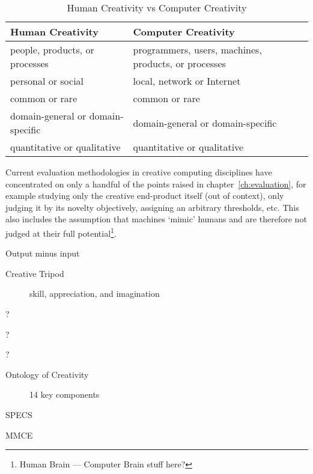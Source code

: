 \begin{table}[htbp]
  \centering
  \begin{tabu}{XX}
  \toprule
  \textbf{Human Creativity} & \textbf{Computer Creativity} \\
  \midrule
  people, products, or processes & programmers, users, machines, products, or processes \\
  personal or social & local, network or Internet \\
  common or rare & common or rare \\
  domain-general or domain-specific & domain-general or domain-specific \\
  quantitative or qualitative & quantitative or qualitative \\
  \bottomrule
  \end{tabu}
\caption[Human Creativity vs Computer Creativity]{Human Creativity vs Computer Creativity}
\label{tab:HCCC}
\end{table}


Current evaluation methodologies in creative computing disciplines have concentrated on only a handful of the points raised in chapter~\ref{ch:evaluation}, for example studying only the creative end-product itself (out of context), only judging it by its novelty objectively, assigning an arbitrary thresholds, etc. This also includes the assumption that machines `mimic' humans and are therefore not judged at their full potential\footnote{Human Brain --- Computer Brain stuff here?}.

\begin{description}
  \item [Output minus input] \autocite[p.2]{Pease2001}
  \item [Creative Tripod] skill, appreciation, and imagination \autocite{Colton2008a, Colton2008}
  \item [?] \autocite{Ritchie2007, Ritchie2001}
  \item [?] \autocite{Ventura2008}
  \item [?] \autocite{Pease2013}
  \item [Ontology of Creativity] 14 key components \autocite{Jordanous2012}
  \item [SPECS] \autocite{Jordanous2012a}
  \item [MMCE] \autocite{Candy2012}
\end{description}



